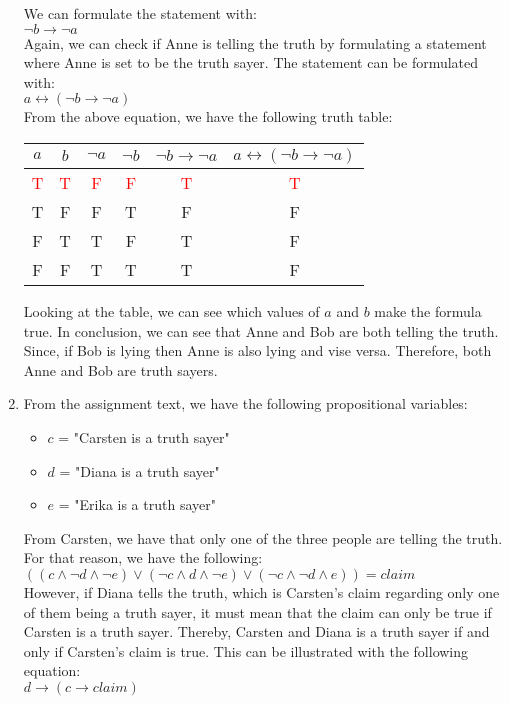 \begin{enumerate}
We can formulate the statement with: \\
$ \neg b \to \neg a$ \\

Again, we can check if Anne is telling the truth by formulating a statement where Anne is set to be the truth sayer. The statement can be formulated with: \\
$a \leftrightarrow (\neg b \to \neg a) $ \\

From the above equation, we have the following truth table:
\begin{center}
\begin{tabular}{ |c|c||c|c|c|c| } 
\hline
$a$ & $b$ & $\neg a$ & $\neg b$ & $\neg b \to \neg a$ & $a \leftrightarrow (\neg b \to \neg a) $  \\
\hline
\hline
\textcolor{red}{T} & \textcolor{red}{T} & \textcolor{red}{F} & \textcolor{red}{F} & \textcolor{red}{T} & \textcolor{red}{T}\\
\hline
T & F & F & T & F & F\\
\hline
F & T & T & F & T & F\\
\hline
F & F & T & T & T & F\\
\hline
\end{tabular}
\end{center}

Looking at the table, we can see which values of $a$ and $b$ make the formula true. In conclusion, we can see that Anne and Bob are both telling the truth. Since, if Bob is lying then Anne is also lying and vise versa. Therefore, both Anne and Bob are truth sayers. 


\item
From the assignment text, we have the following propositional variables:
\begin{itemize}
    \item $c$ = "Carsten is a truth sayer"
    \item $d$ = "Diana is a truth sayer"
    \item $e$ = "Erika is a truth sayer"
\end{itemize}

From Carsten, we have that only one of the three people are telling the truth. For that reason, we have the following: \\
$ ((c \land \neg d \land \neg e) \lor (\neg c \land d \land \neg e) \lor (\neg c \land \neg d \land e)) = claim$ \\

However, if Diana tells the truth, which is Carsten's claim regarding only one of them being a truth sayer, it must mean that the claim can only be true if Carsten is a truth sayer. Thereby, Carsten and Diana is a truth sayer if and only if Carsten's claim is true. This can be illustrated with the following equation: \\
$ d \to (c \to claim)$ \\


\end{enumerate}
